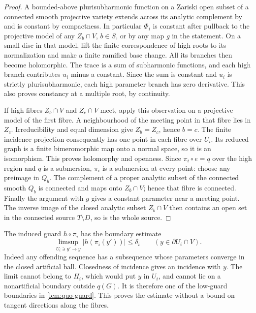 \begin{proof}
A bounded-above plurisubharmonic function on a Zariski open subset of a connected smooth projective variety extends across its analytic complement by \cite[I.5.24]{DemaillyCADG} and is constant by compactness. In particular $\Phi_i$ is constant after pullback to the projective model of any $Z_b\cap V$, $b\in S$, or by any map $g$ in the statement. On a small disc in that model, lift the finite correspondence of high roots to its normalization and make a finite ramified base change. All its branches then become holomorphic. The trace is a sum of subharmonic functions, and each high branch contributes $u_i$ minus a constant. Since the sum is constant and $u_i$ is strictly plurisubharmonic, each high parameter branch has zero derivative. This also proves constancy at a multiple root, by continuity.

If high fibres $Z_b\cap V$ and $Z_c\cap V$ meet, apply this observation on a projective model of the first fibre. A neighbourhood of the meeting point in that fibre lies in $Z_c$. Irreducibility and equal dimension give $Z_b=Z_c$, hence $b=c$. The finite incidence projection consequently has one point in each fibre over $U_i$. Its reduced graph is a finite bimeromorphic map onto a normal space, so it is an isomorphism. This proves holomorphy and openness. Since $\pi_i\circ e=q$ over the high region and $q$ is a submersion, $\pi_i$ is a submersion at every point: choose any preimage in $Q_b$. The complement of a proper analytic subset of the connected smooth $Q_b$ is connected and maps onto $Z_b\cap V$; hence that fibre is connected. Finally the argument with $g$ gives a constant parameter near a meeting point. The inverse image of the closed analytic subset $Z_b\cap V$ then contains an open set in the connected source $T\setminus D$, so is the whole source.
\end{proof}

The induced guard $h\circ\pi_i$ has the boundary estimate
\begin{equation}\label{eq:quo-chart-boundary}
 \limsup_{U_i\ni y'\to y}|h(\pi_i(y'))|\leq\delta_i
 \qquad(y\in\partial U_i\cap V).
\end{equation}
Indeed any offending sequence has a subsequence whose parameters converge in the closed artificial ball. Closedness of incidence gives an incidence with $y$. The limit cannot belong to $H_i$, which would put $y$ in $U_i$, and cannot lie on a nonartificial boundary outside $q(G)$. It is therefore one of the low-guard boundaries in \cref{lem:quo-guard}. This proves the estimate without a bound on tangent directions along the fibres.

